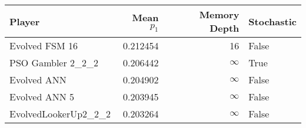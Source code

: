 \begin{tabular}{lrrl}
\toprule
               Player &  Mean $p_1$ &  Memory Depth & Stochastic \\
\midrule
       Evolved FSM 16 &    0.212454 &            16 &      False \\
    PSO Gambler 2\_2\_2 &    0.206442 &            \(\infty\) &       True \\
          Evolved ANN &    0.204902 &            \(\infty\) &      False \\
        Evolved ANN 5 &    0.203945 &            \(\infty\) &      False \\
 EvolvedLookerUp2\_2\_2 &    0.203264 &            \(\infty\) &      False \\
\bottomrule
\end{tabular}
